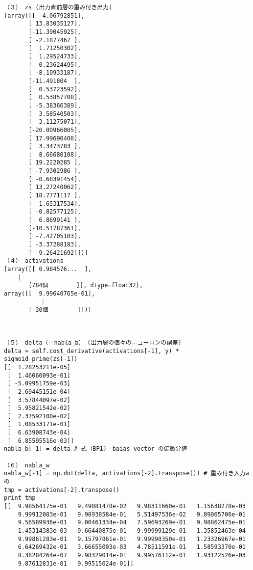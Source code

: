 \documentclass[11pt,a4j,fleqn]{jarticle}
\begin{document}
\begin{verbatim}
（３） zs (出力直前層の重み付き出力)
[array([[ -4.06792851],
       [ 13.83035127],
       [-11.39045925],
       [ -2.1877467 ],
       [  1.71250302],
       [  1.29524733],
       [  0.23624495],
       [ -8.10933187],
       [-11.491804  ],
       [  0.53723592],
       [  0.53857708],
       [ -5.38366389],
       [  3.58540503],
       [  3.11275071],
       [-20.00966085],
       [ 17.99690408],
       [  3.3473783 ],
       [  8.66680108],
       [ 19.2220285 ],
       [ -7.9302986 ],
       [ -0.68391454],
       [ 13.27240062],
       [ 18.7771117 ],
       [ -1.65317534],
       [ -0.82577125],
       [  6.8699141 ],
       [-10.51787361],
       [ -7.42705103],
       [ -3.37288183],
       [  9.26421692]])]
（４） activations
[array([[ 0.984576...  ],
	|
       [784個        ]], dtype=float32), 
array([[  9.99640765e-01],
       　　｜
       [ 30個　　　　　]])]



（５） delta（＝nabla_b）　(出力層の個々のニューロンの誤差)
delta = self.cost_derivative(activations[-1], y) *  sigmoid_prime(zs[-1]) 
[[  1.28253211e-05]
 [  1.46060093e-01]
 [ -5.09951759e-03]
 [  2.69445151e-04]
 [  3.57844097e-02]
 [  5.95821542e-02]
 [  2.37592100e-02]
 [  1.08533171e-01]
 [  6.63908743e-04]
 [  6.85595516e-03]]
nabla_b[-1] = delta # 式（BP1)　baias-voctor の偏微分値

（６） nabla_w
nabla_w[-1] = np.dot(delta, activations[-2].transpose()) # 重み付き入力wの
tmp = activations[-2].transpose()
print tmp
[[  9.98564175e-01   9.49081478e-02   9.98311660e-01   1.15638278e-03
    9.99912083e-01   9.98938584e-01   5.51497536e-02   9.89065706e-01
    9.56589936e-01   9.00461334e-04   7.59693269e-01   9.98862475e-01
    1.45314383e-03   9.66440875e-01   9.99999129e-01   1.35852463e-04
    9.99861283e-01   9.15797861e-01   9.99998350e-01   1.23326967e-01
    6.64269432e-01   3.66655003e-03   4.78511591e-01   1.58593370e-01
    8.38284264e-07   9.98329014e-01   9.99576112e-01   1.93122526e-03
    9.87612831e-01   9.99515624e-01]]


\end{verbatim}
\end{document}
